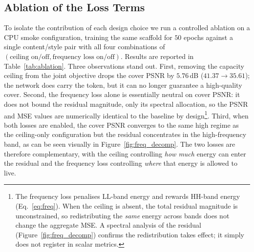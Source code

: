 \documentclass[conference]{IEEEtran}
\begin{document}
\subsection{Ablation of the Loss Terms}
\label{sec:ablation}
To isolate the contribution of each design choice we run a controlled ablation on a CPU smoke configuration, training the same scaffold for $50$ epochs against a single content/style pair with all four combinations of $(\text{ceiling on/off}, \text{frequency loss on/off})$. Results are reported in Table~\ref{tab:ablation}. Three observations stand out. First, removing the capacity ceiling from the joint objective drops the cover PSNR by $5.76$\,dB ($41.37\to35.61$); the network does carry the token, but it can no longer guarantee a high-quality cover. Second, the frequency loss alone is essentially neutral on cover PSNR: it does not bound the residual magnitude, only its spectral allocation, so the PSNR and MSE values are numerically identical to the baseline by design\footnote{The frequency loss penalises LL-band energy and rewards HH-band energy (Eq.~\ref{eq:freq}). When the ceiling is absent, the total residual magnitude is unconstrained, so redistributing the \emph{same} energy across bands does not change the aggregate MSE. A spectral analysis of the residual (Figure~\ref{fig:freq_decomp}) confirms the redistribution takes effect; it simply does not register in scalar metrics.}. Third, when both losses are enabled, the cover PSNR converges to the same high regime as the ceiling-only configuration but the residual concentrates in the high-frequency band, as can be seen visually in Figure~\ref{fig:freq_decomp}. The two losses are therefore complementary, with the ceiling controlling \emph{how much} energy can enter the residual and the frequency loss controlling \emph{where} that energy is allowed to live.

\begin{table}[t]
\centering
\caption{Effect of the capacity ceiling and the frequency loss. CPU smoke run, $50$ epochs, one content/style pair, $192\!\times\!192$ images, $\alpha=0.025$, lr $10^{-3}$. Token MSE units are $\times10^{-2}$; cover MSE units are $\times10^{-4}$.}
\label{tab:ablation}
\setlength{\tabcolsep}{4pt}
\end{table}
\end{document}
